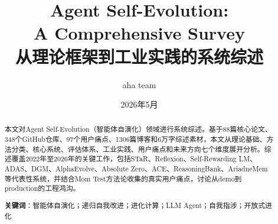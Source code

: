 \documentclass[11pt,a4paper]{article}
\title{\textbf{Agent Self-Evolution: \\ A Comprehensive Survey}\\[6pt]
\large 从理论框架到工业实践的系统综述}
\author{aha team}
\date{2026年5月}
\begin{document}
\maketitle

\begin{abstract}
本文对Agent Self-Evolution（智能体自演化）领域进行系统综述。基于88篇核心论文、348个GitHub仓库、97个用户痛点、1306篇博客和6万字综述素材，本文从理论基础、方法分类、核心系统、评估体系、工业实践、用户痛点和未来方向七个维度展开分析。综述覆盖2022年至2026年的关键工作，包括STaR、Reflexion、Self-Rewarding LM、ADAS、DGM、AlphaEvolve、Absolute Zero、ACE、ReasoningBank、AriadneMem等代表性系统，并结合Mom Test方法论收集的真实用户痛点，讨论从demo到production的工程鸿沟。

\textbf{关键词}：智能体自演化；递归自我改进；进化计算；LLM Agent；自我指涉；开放式进化
\end{abstract}

\tableofcontents
\newpage














\end{document}
